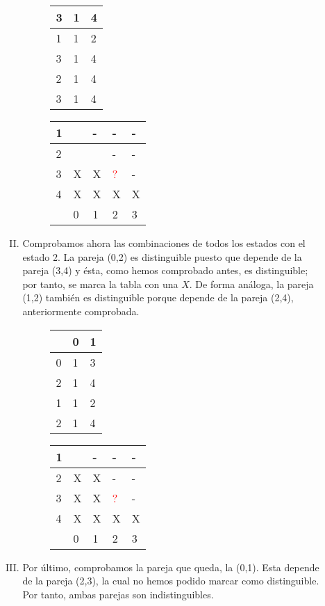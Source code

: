 \documentclass[11pt,a4paper]{article}
\begin{document}
\begin{enumerate}[a)]
\begin{enumerate}[1.]
\begin{enumerate}[I.]
\begin{figure}[H]
\begin{tabular}{l|ll}
				3 & 1 & 4 \\ \hline
				1 & 1 & 2 \\
				3 & 1 & 4 \\ \hline
				2 & 1 & 4 \\
				3 & 1 & 4
			\end{tabular}
		\end{figure}
		\begin{figure}[H]
		\centering
				\begin{tabular}{|l|l|l|l|l|}
				\hline
				1 &  & - & - & - \\ \hline
				2 &  &  & - & - \\ \hline
				3 & X & X & \textcolor{red}{?} & - \\ \hline
				4 & X & X & X & X \\ \hline
			  	  & 0 & 1 & 2 & 3 \\ \hline
				\end{tabular}
		\end{figure}
		\item Comprobamos ahora las combinaciones de todos los estados con el estado 2. La pareja (0,2) es distinguible puesto que depende de la pareja (3,4) y ésta, como hemos comprobado antes, es distinguible; por tanto, se marca la tabla con una $X$. De forma análoga, la pareja (1,2) también es distinguible porque depende de la pareja (2,4), anteriormente comprobada. 
		\begin{figure}[H]
		\centering
			\begin{tabular}{l|ll}
				  & 0 & 1 \\ \hline
				0 & 1 & 3 \\
				2 & 1 & 4 \\ \hline
				1 & 1 & 2 \\
				2 & 1 & 4 
			\end{tabular}
		\end{figure}
		\begin{figure}[H]
		\centering
				\begin{tabular}{|l|l|l|l|l|}
				\hline
				1 &  & - & - & - \\ \hline
				2 & X & X & - & - \\ \hline
				3 & X & X & \textcolor{red}{?} & - \\ \hline
				4 & X & X & X & X \\ \hline
			  	  & 0 & 1 & 2 & 3 \\ \hline
				\end{tabular}
		\end{figure}
		\item Por último, comprobamos la pareja que queda, la (0,1). Esta depende de la pareja (2,3), la cual no hemos podido marcar como distinguible. Por tanto, ambas parejas son indistinguibles.
		

\end{enumerate}
\end{enumerate}
\end{enumerate}
\end{document}
